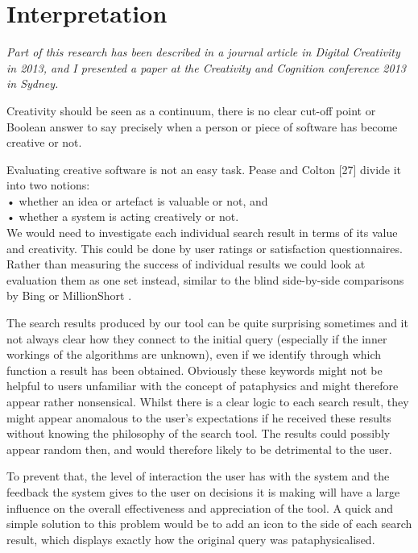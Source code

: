 
\chapter{Interpretation}
\label{ch:interpretation}

\emph{Part of this research has been described in a journal article in Digital Creativity in 2013, and I presented a paper at the Creativity and Cognition conference 2013 in Sydney.}

\grule

\begin{draft}
  Creativity should be seen as a continuum, there is no clear cut-off point or Boolean answer to say precisely when a person or piece of software has become creative or not.
\end{draft}

Evaluating creative software is not an easy task. Pease and Colton [27] divide it into two notions: \\
•	whether an idea or artefact is valuable or not, and\\
•	whether a system is acting creatively or not.\\

We would need to investigate each individual search result in terms of its value and creativity. This could be done by user ratings or satisfaction questionnaires. Rather than measuring the success of individual results we could look at evaluation them as one set instead, similar to the blind side-by-side comparisons by Bing or MillionShort .

The search results produced by our tool can be quite surprising sometimes and it not always clear how they connect to the initial query (especially if the inner workings of the algorithms are unknown), even if we identify through which function a result has been obtained. Obviously these keywords might not be helpful to users unfamiliar with the concept of pataphysics and might therefore appear rather nonsensical. Whilst there is a clear logic to each search result, they might appear anomalous to the user’s expectations if he received these results without knowing the philosophy of the search tool. The results could possibly appear random then, and would therefore likely to be detrimental to the user.

To prevent that, the level of interaction the user has with the system and the feedback the system gives to the user on decisions it is making will have a large influence on the overall effectiveness and appreciation of the tool. A quick and simple solution to this problem would be to add an icon to the side of each search result, which displays exactly how the original query was pataphysicalised.

